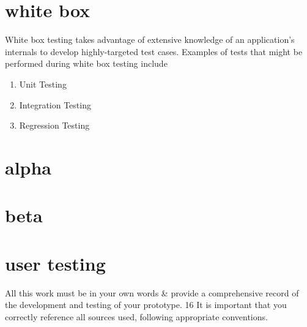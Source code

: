 \documentclass{article}
\begin{document}
\section{white box}
White box testing takes advantage of extensive knowledge of an application's internals to develop highly-targeted test cases. Examples of tests that might be performed during white box testing include

\begin{enumerate}
	\item Unit Testing
	\item Integration Testing
	\item Regression Testing
\end{enumerate}

\section{alpha}
\section{beta}
\section{user testing}
All this work must be in your own words \& provide a comprehensive record of the development
and testing of your prototype.
16
It is important that you correctly reference all sources used, following appropriate conventions.
\end{document}

